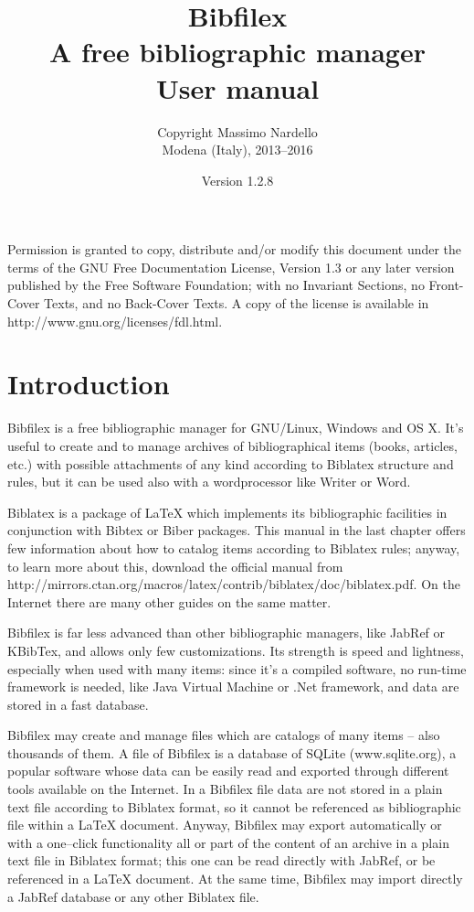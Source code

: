\documentclass[a4paper,12pt]{report}
\title{\textbf{{\Huge Bibfilex}}\\
A free bibliographic manager\vspace{20pt}%
\\User manual}
\author{Copyright Massimo Nardello\\Modena (Italy), 2013--2016}
\date{Version 1.2.8}
\begin{document}
\maketitle

Permission is granted to copy, distribute and/or modify this document under the terms of
the GNU Free Documentation License, Version 1.3 or any later version published by the Free
Software Foundation; with no Invariant Sections, no Front-Cover Texts, and no Back-Cover
Texts. A copy of the license is available in http://www.gnu.org/licenses/fdl.html.

\chapter*{Introduction}

Bibfilex is a free bibliographic manager for GNU/Linux, Windows and OS X. It's useful to create and to manage archives of bibliographical items (books, articles, etc.) with possible attachments of any kind according to Biblatex structure and rules, but it can be used also with a wordprocessor like Writer or Word.

Biblatex is a package of LaTeX which implements its bibliographic facilities in conjunction with Bibtex or Biber packages. This manual in the last chapter offers few information about how to catalog items according to Biblatex rules; anyway, to learn more about this, download the official manual from http://mirrors.ctan.org/macros/latex/contrib/biblatex/doc/biblatex.pdf. On the Internet there are many other guides on the same matter.

Bibfilex is far less advanced than other bibliographic managers, like JabRef or KBibTex, and allows only few customizations. Its strength is speed and lightness, especially when used with many items: since it's a compiled software, no run-time framework is needed, like Java Virtual Machine or .Net framework, and data are stored in a fast database.

Bibfilex may create and manage files which are catalogs of many items -- also thousands of them. A file of Bibfilex is a database of SQLite (www.sqlite.org), a popular software whose data can be easily read and exported through different tools available on the Internet. In a Bibfilex file data are not stored in a plain text file according to Biblatex format, so it cannot be referenced as bibliographic file within a LaTeX document. Anyway, Bibfilex may export automatically or with a one--click functionality all or part of the content of an archive in a plain text file in Biblatex format; this one can be read directly with JabRef, or be referenced in a LaTeX document. At the same time, Bibfilex may import directly a JabRef database or any other Biblatex file.
\end{document}
